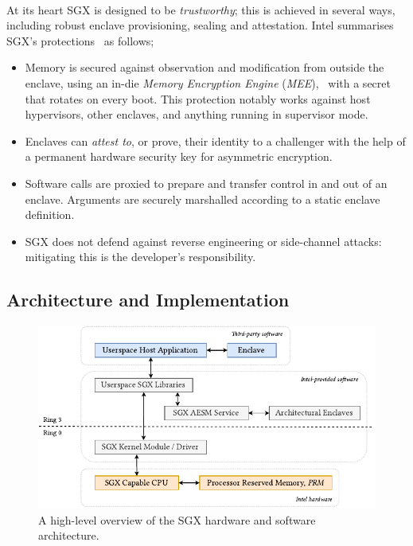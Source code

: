 \paragraph{} At its heart SGX is designed to be \textit{trustworthy}; this is achieved in several ways, including robust enclave provisioning, sealing and attestation. Intel summarises SGX's protections~\cite{10.1145/2487726.2488368,sgx-eval-sdk} as follows;

\begin{itemize}
    \item Memory is secured against observation and modification from outside the enclave, using an in-die \textit{Memory Encryption Engine} (\textit{MEE}),~\cite{sgx-mee} with a secret that rotates on every boot. This protection notably works against host hypervisors, other enclaves, and anything running in supervisor mode.
    \item Enclaves can \textit{attest to}, or prove, their identity to a challenger with the help of a permanent hardware security key for asymmetric encryption.
    \item Software calls are proxied to prepare and transfer control in and out of an enclave. Arguments are securely marshalled according to a static enclave definition.
    \item SGX does not defend against reverse engineering or side-channel attacks:~\cite{10.1109/SP.2015.45} mitigating this is the developer's responsibility.
\end{itemize}

\subsection{Architecture and Implementation}

\begin{figure}[]
    \centering
    \includegraphics[width=0.9\linewidth]{figures/SGX-AdvArchitecture.pdf}
    \caption{A high-level overview of the SGX hardware and software architecture.}
    \label{fig:sgx-advarch}
\end{figure}

